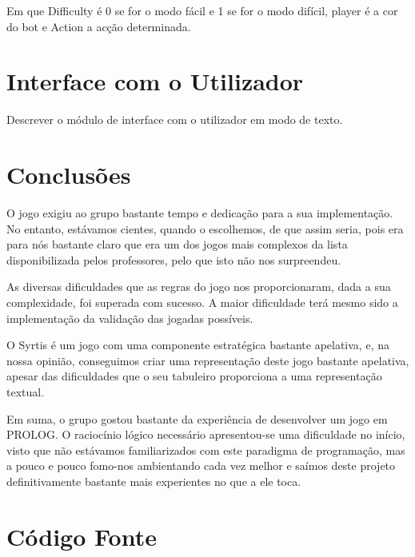\documentclass[a4paper]{article}
\begin{document}
Em que Difficulty é 0 se for o modo fácil e 1 se for o modo difícil, player é a cor do bot e Action a acção determinada.

\section{Interface com o Utilizador}

Descrever o módulo de interface com o utilizador em modo de texto.


\section{Conclusões}
O jogo exigiu ao grupo bastante tempo e dedicação para a sua implementação. No entanto, estávamos cientes, quando o escolhemos, de que assim seria, pois era para nós bastante claro que era um dos jogos mais complexos da lista disponibilizada pelos professores, pelo que isto não nos surpreendeu.

As diversas dificuldades que as regras do jogo nos proporcionaram, dada a sua complexidade, foi superada com sucesso. A maior dificuldade terá mesmo sido a implementação da validação das jogadas possíveis.

O Syrtis é um jogo com uma componente estratégica bastante apelativa, e, na nossa opinião, conseguimos criar uma representação deste jogo bastante apelativa, apesar das dificuldades que o seu tabuleiro proporciona a uma representação textual.

Em suma, o grupo gostou bastante da experiência de desenvolver um jogo em PROLOG. O raciocínio lógico necessário apresentou-se uma dificuldade no início, visto que não estávamos familiarizados com este paradigma de programação, mas a pouco e pouco fomo-nos ambientando cada vez melhor e saímos deste projeto definitivamente bastante mais experientes no que a ele toca.


\clearpage
{}
\renewcommand\refname{Bibliografia}



\newpage
\appendix
\section{Código Fonte}

\end{document}
